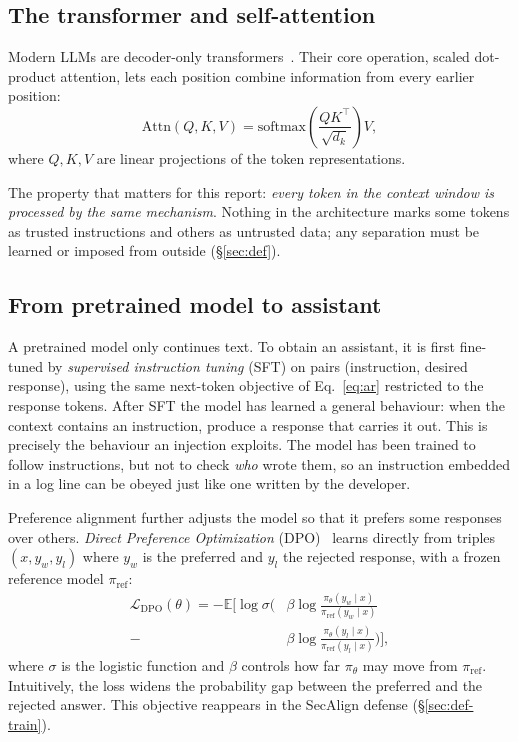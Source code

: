 \subsection{The transformer and self-attention}
\label{sec:llm-attn}

Modern LLMs are decoder-only transformers~\cite{vaswani2017attention}. Their core operation, scaled dot-product attention, lets each position combine information from every earlier position:
\begin{equation}
\mathrm{Attn}(Q,K,V) = \mathrm{softmax}\!\left(\frac{QK^\top}{\sqrt{d_k}}\right)V,
\label{eq:attn}
\end{equation}
where $Q,K,V$ are linear projections of the token representations.

The property that matters for this report: \emph{every token in the context window is processed by the same mechanism}. Nothing in the architecture marks some tokens as trusted instructions and others as untrusted data; any separation must be learned or imposed from outside (\S\ref{sec:def}).

\subsection{From pretrained model to assistant}
\label{sec:llm-align}

A pretrained model only continues text. To obtain an assistant, it is first fine-tuned by \emph{supervised instruction tuning} (SFT) on pairs (instruction, desired response), using the same next-token objective of Eq.~\eqref{eq:ar} restricted to the response tokens. After SFT the model has learned a general behaviour: when the context contains an instruction, produce a response that carries it out. This is precisely the behaviour an injection exploits. The model has been trained to follow instructions, but not to check \emph{who} wrote them, so an instruction embedded in a log line can be obeyed just like one written by the developer.

Preference alignment further adjusts the model so that it prefers some responses over others. \emph{Direct Preference Optimization} (DPO)~\cite{rafailov2023dpo} learns directly from triples $(x, y_w, y_l)$ where $y_w$ is the preferred and $y_l$ the rejected response, with a frozen reference model $\pi_{\mathrm{ref}}$:
\begin{equation}
\begin{split}
\mathcal{L}_{\mathrm{DPO}}(\theta) = -\mathbb{E}\Big[\log\sigma\Big(&\beta\log\frac{\pi_\theta(y_w\mid x)}{\pi_{\mathrm{ref}}(y_w\mid x)}\\
 - {}&\beta\log\frac{\pi_\theta(y_l\mid x)}{\pi_{\mathrm{ref}}(y_l\mid x)}\Big)\Big],
\end{split}
\label{eq:dpo}
\end{equation}
where $\sigma$ is the logistic function and $\beta$ controls how far $\pi_\theta$ may move from $\pi_{\mathrm{ref}}$. Intuitively, the loss widens the probability gap between the preferred and the rejected answer. This objective reappears in the SecAlign defense (\S\ref{sec:def-train}).


